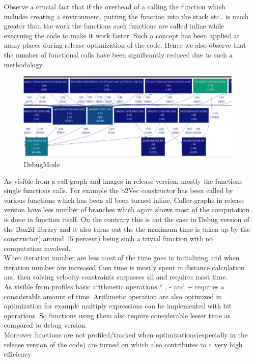 \documentclass[a4paper,11pt]{article}
\begin{document}
Observe a crucial fact that if the overhead of a calling the function which includes creating a environment, putting the function into the stack etc.. is much greater than the work the functions such functions are called inline while exectuing the code to make it work faster. Such a concept has been applied at many places during release optimization of the code. 
Hence we also observe that the number of functional calls have been significantly reduced due to such a methodology.\\
\begin{figure}[ht]
	\includegraphics[width=180mm]{images/3.eps}
	\caption{DebugMode }			
\end{figure}
As visible from a call graph and images in release version, mostly the functions single functions calls.
For example  the b2Vec constructor has been called by various functions which has been  all been turned inline.
Caller-graphs in release version have less number of branches which again shows most of the computation is done in function itself. On the contrary this is not the case in Debug version of the Box2d library and it also turns out the the maximum time is taken up by the constructor( around 15 percent) being such a trivial function with no computation involved.\\
When iteration number are less most of the time goes in initializing and when iteration number are increased then time is mostly spent in distance calculation and then solving velocity constraints surpasses all and requires most time.\\

As visible from profiles basic arithmetic operations * , - and + requires a considerable amount of time. Arithmetic operation are also optimized in optimization for example multiply expressions can be implemented with bit operations. So functions using them also require considerable lesser time as compared to debug version.
\\
Moreover functions are not profiled/tracked when optimizations(especially in the release version of the code) are turned on which also contributes to a very high efficiency
\\
\end{document}
